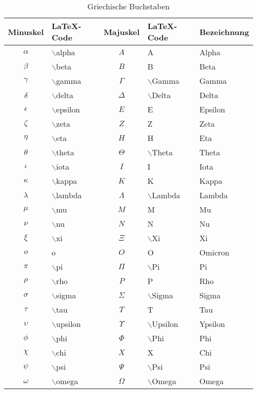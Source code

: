 \begin{table}[h]
\centering
\begin{tabular}{c|l|c|l|l}
\hline
\textbf{Minuskel} & \textbf{\LaTeX-Code} & \textbf{Majuskel} & \textbf{\LaTeX-Code} & \textbf{Bezeichnung} \\
\hline
$\alpha $ & $\backslash$alpha & $A $ & A & Alpha \\
$\beta $ & $\backslash$beta & $B $ & B & Beta \\
$\gamma $ & $\backslash$gamma & $\Gamma $ & $\backslash$Gamma & Gamma \\
$\delta $ & $\backslash$delta & $\Delta $ & $\backslash$Delta & Delta \\
$\epsilon$ & $\backslash$epsilon  & $E $ & E & Epsilon \\
$\zeta $ & $\backslash$zeta & $Z $ & Z & Zeta \\
$\eta $ & $\backslash$eta & $H $ & H &  Eta\\
$\theta $ & $\backslash$theta & $\Theta $ & $\backslash$Theta & Theta \\
$\iota $ & $\backslash$iota & $I $ & I & Iota \\
$\kappa $ & $\backslash$kappa & $K $ & K & Kappa \\
$\lambda $ & $\backslash$lambda & $\Lambda $ & $\backslash$Lambda & Lambda \\
$\mu $ & $\backslash$mu & $M $ & M & Mu \\
$\nu $ & $\backslash$nu & $N $ & N & Nu \\
$\xi $ & $\backslash$xi & $\Xi $ & $\backslash$Xi &  Xi \\
$o $ & o & $O $ & O & Omicron \\
$\pi $ & $\backslash$pi & $\Pi $ & $\backslash$Pi & Pi \\
$\rho $ & $\backslash$rho & $P $ & P & Rho \\
$\sigma $ & $\backslash$sigma & $\Sigma $ & $\backslash$Sigma & Sigma  \\
$\tau $ & $\backslash$tau & $T $ & T & Tau \\
$\upsilon $ & $\backslash$upsilon & $\Upsilon $ & $\backslash$Upsilon & Ypsilon \\
$\phi $ & $\backslash$phi & $\Phi $ & $\backslash$Phi & Phi \\
$\chi $ & $\backslash$chi & $X $ & X & Chi \\
$\psi $ & $\backslash$psi & $\Psi $ & $\backslash$Psi & Psi \\
$\omega $ & $\backslash$omega & $\Omega $ & $\backslash$Omega & Omega \\
\hline
\end{tabular}
\caption{Griechische Buchstaben}
\label{tab:greek}
\end{table}

